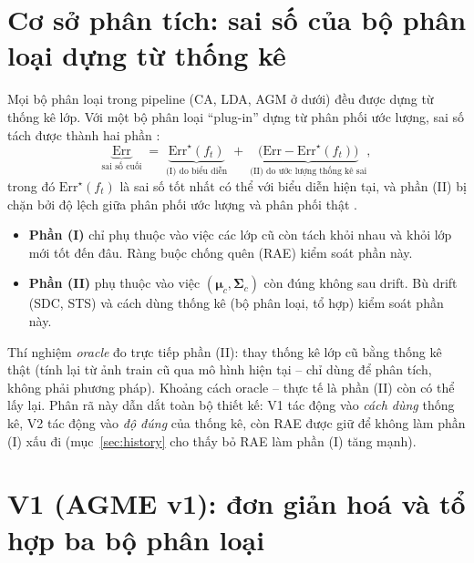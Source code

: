 \documentclass[11pt]{article}
\newcommand{\bmu}{\boldsymbol{\mu}}
\newcommand{\bSigma}{\boldsymbol{\Sigma}}
\begin{document}
\section{Cơ sở phân tích: sai số của bộ phân loại dựng từ thống kê}\label{sec:theory}

Mọi bộ phân loại trong pipeline (CA, LDA, AGM ở dưới) đều được dựng từ thống kê lớp. Với một bộ phân loại
``plug-in'' dựng từ phân phối ước lượng, sai số tách được thành hai phần \cite[Định lý~2.2]{devroye}:
\begin{equation}
  \underbrace{\mathrm{Err}}_{\text{sai số cuối}} \;=\;
  \underbrace{\mathrm{Err}^{\star}(f_t)}_{\text{(I) do biểu diễn}} \;+\;
  \underbrace{\big(\mathrm{Err}-\mathrm{Err}^{\star}(f_t)\big)}_{\text{(II) do ước lượng thống kê sai}},
\end{equation}
trong đó $\mathrm{Err}^\star(f_t)$ là sai số tốt nhất có thể với biểu diễn hiện tại, và phần (II) bị chặn bởi độ lệch
giữa phân phối ước lượng và phân phối thật \cite{devroye}.

\begin{itemize}
\item \textbf{Phần (I)} chỉ phụ thuộc vào việc các lớp cũ còn tách khỏi nhau và khỏi lớp mới tốt đến đâu. Ràng buộc
chống quên (RAE) kiểm soát phần này.
\item \textbf{Phần (II)} phụ thuộc vào việc $(\bmu_c,\bSigma_c)$ còn đúng không sau drift. Bù drift (SDC, STS) và cách
dùng thống kê (bộ phân loại, tổ hợp) kiểm soát phần này.
\end{itemize}
Thí nghiệm \emph{oracle} đo trực tiếp phần (II): thay thống kê lớp cũ bằng thống kê thật (tính lại từ ảnh train cũ qua
mô hình hiện tại -- chỉ dùng để phân tích, không phải phương pháp). Khoảng cách oracle -- thực tế là phần (II) còn có
thể lấy lại. Phân rã này dẫn dắt toàn bộ thiết kế: V1 tác động vào \emph{cách dùng} thống kê, V2 tác động vào
\emph{độ đúng} của thống kê, còn RAE được giữ để không làm phần (I) xấu đi (mục~\ref{sec:history} cho thấy bỏ RAE làm
phần (I) tăng mạnh).

\section{V1 (AGME v1): đơn giản hoá và tổ hợp ba bộ phân loại}\label{sec:v1}
\end{document}
